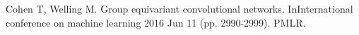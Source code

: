 \begin{latin}
	\begin{thebibliography}{9}
		Cohen T, Welling M. Group equivariant convolutional networks. InInternational conference on machine learning 2016 Jun 11 (pp. 2990-2999). PMLR.
		
	\end{thebibliography} 
\end{latin}














%
%
%
%
